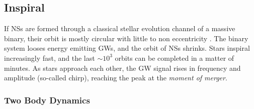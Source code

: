 


\subsection{Inspiral}

If \acp{NS} are formed through a classical stellar evolution channel of a massive binary, 
their orbit is mostly circular with little to non eccentricity \citep{Aasi:2013wya}. 
%
The binary system looses energy emitting \acp{GW}, and the orbit of \acp{NS} 
shrinks. Stars inspiral increasingly fast, and the last ${\sim}10^3$ orbits can be completed in 
a matter of minutes. As stars approach each other, the \ac{GW} signal rises in 
frequency and amplitude (so-called chirp), reaching the peak at the \textit{moment of merger}.

\subsubsection{Two Body Dynamics}


